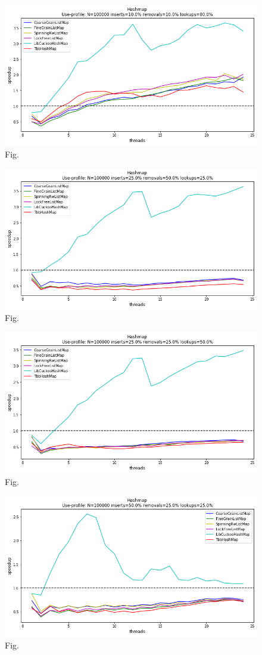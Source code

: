 \documentclass[11pt]{article}
\begin{document}
\begin{figure}[h]
\centering
\includegraphics[width=0.5\linewidth]{figs/lateday/combined/lateday_combined_map_insert_10_lookup_80_removal_10}
\caption{Fig.}
\label{fig:fig2}
\end{figure}

\begin{figure}[h]
\centering
\includegraphics[width=0.5\linewidth]{figs/lateday/combined/lateday_combined_map_insert_25_lookup_25_removal_50}
\caption{Fig.}
\label{fig:fig2}
\end{figure}

\begin{figure}[h]
\centering
\includegraphics[width=0.5\linewidth]{figs/lateday/combined/lateday_combined_map_insert_25_lookup_50_removal_25}
\caption{Fig.}
\label{fig:fig2}
\end{figure}

\begin{figure}[h]
\centering
\includegraphics[width=0.5\linewidth]{figs/lateday/combined/lateday_combined_map_insert_50_lookup_25_removal_25}
\caption{Fig.}
\label{fig:fig2}
\end{figure}
\end{document}
